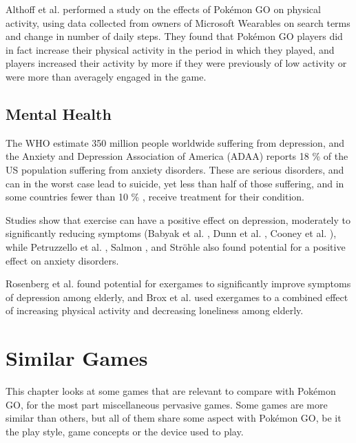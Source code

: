 Althoff et al. \cite{althoff2016influence} performed a study on the effects of Pokémon GO on physical activity, using data collected from owners of Microsoft Wearables on search terms and change in number of daily steps. They found that Pokémon GO players did in fact increase their physical activity in the period in which they played, and players increased their activity by more if they were previously of low activity or were more than averagely engaged in the game.

\section{Mental Health}
\label{sec:lit-study-mental-health}

The WHO \cite{WHOdepression} estimate 350 million people worldwide suffering from depression, and the Anxiety and Depression Association of America (ADAA) \cite{ADAAanxiety} reports 18 \% of the US population suffering from anxiety disorders. These are serious disorders, and can in the worst case lead to suicide, yet less than half of those suffering, and in some countries fewer than 10 \% \cite{WHOdepression}, receive treatment for their condition.

Studies show that exercise can have a positive effect on depression, moderately to significantly reducing symptoms (Babyak et al. \cite{babyak2000exercise}, Dunn et al. \cite{dunn2005exercise}, Cooney et al. \cite{cooney2014exercise}), while Petruzzello et al. \cite{petruzzello1991meta}, Salmon \cite{salmon2001effects}, and Ströhle \cite{strohle2009physical} also found potential for a positive effect on anxiety disorders.

Rosenberg et al. \cite{rosenberg2010exergames} found potential for exergames to significantly improve symptoms of depression among elderly, and Brox et al. \cite{brox2011exergames} used exergames to a combined effect of increasing physical activity and decreasing loneliness among elderly.


\chapter{Similar Games}
\label{chapter:lit-study-similar-games}

This chapter looks at some games that are relevant to compare with Pokémon GO, for the most part miscellaneous pervasive games. Some games are more similar than others, but all of them share some aspect with Pokémon GO, be it the play style, game concepts or the device used to play.

